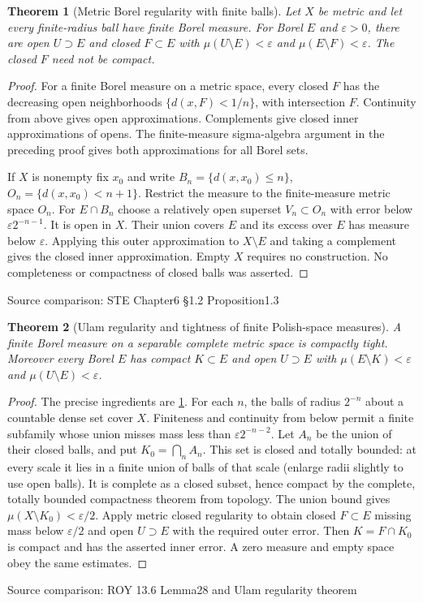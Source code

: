 \documentclass[11pt,oneside,openany]{book}
\newtheorem{theorem}{Theorem}[chapter]
\theoremstyle{definition}
\theoremstyle{remark}
\newcommand{\eps}{\varepsilon}\newcommand{\ee}{\varepsilon}
\newcommand{\family}[1]{}
\newcommand{\source}[1]{\par\begingroup\small\sffamily\color{black!65}Source comparison: #1\par\endgroup}
\begin{document}
\begin{theorem}[Metric Borel regularity with finite balls]\family{D11.18.metric_closed_regular}\label{d11:18:metric-closed-regular}
Let $X$ be metric and let every finite-radius ball have finite Borel measure. For Borel $E$ and $\eps>0$, there are open $U\supset E$ and closed $F\subset E$ with $\mu(U\setminus E)<\eps$ and $\mu(E\setminus F)<\eps$. The closed $F$ need not be compact.
\end{theorem}
\begin{proof}
For a finite Borel measure on a metric space, every closed $F$ has the decreasing open neighborhoods $\{d(x,F)<1/n\}$, with intersection $F$. Continuity from above gives open approximations. Complements give closed inner approximations of opens. The finite-measure sigma-algebra argument in the preceding proof gives both approximations for all Borel sets.

If $X$ is nonempty fix $x_0$ and write $B_n=\{d(x,x_0)\le n\}$, $O_n=\{d(x,x_0)<n+1\}$. Restrict the measure to the finite-measure metric space $O_n$. For $E\cap B_n$ choose a relatively open superset $V_n\subset O_n$ with error below $\eps2^{-n-1}$. It is open in $X$. Their union covers $E$ and its excess over $E$ has measure below $\eps$. Applying this outer approximation to $X\setminus E$ and taking a complement gives the closed inner approximation. Empty $X$ requires no construction. No completeness or compactness of closed balls was asserted.
\end{proof}
\source{STE Chapter6 §1.2 Proposition1.3}

\begin{theorem}[Ulam regularity and tightness of finite Polish-space measures]\family{D11.18.polish_tightness_regular}\label{d11:18:polish-tightness-regular}
A finite Borel measure on a separable complete metric space is compactly tight. Moreover every Borel $E$ has compact $K\subset E$ and open $U\supset E$ with $\mu(E\setminus K)<\eps$ and $\mu(U\setminus E)<\eps$.
\end{theorem}
\begin{proof}
The precise ingredients are \cref{d11:18:metric-closed-regular}. For each $n$, the balls of radius $2^{-n}$ about a countable dense set cover $X$. Finiteness and continuity from below permit a finite subfamily whose union misses mass less than $\eps2^{-n-2}$. Let $A_n$ be the union of their closed balls, and put $K_0=\bigcap_n A_n$. This set is closed and totally bounded: at every scale it lies in a finite union of balls of that scale (enlarge radii slightly to use open balls). It is complete as a closed subset, hence compact by the complete, totally bounded compactness theorem from topology. The union bound gives $\mu(X\setminus K_0)<\eps/2$. Apply metric closed regularity to obtain closed $F\subset E$ missing mass below $\eps/2$ and open $U\supset E$ with the required outer error. Then $K=F\cap K_0$ is compact and has the asserted inner error. A zero measure and empty space obey the same estimates.
\end{proof}
\source{ROY 13.6 Lemma28 and Ulam regularity theorem}
\end{document}
